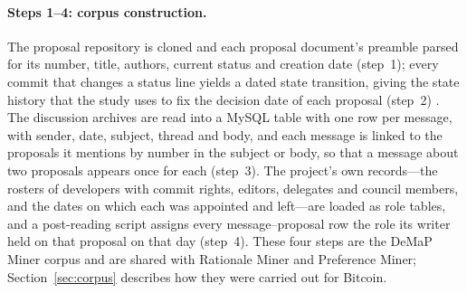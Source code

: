 \documentclass[sigconf,screen]{acmart}
\begin{document}
\paragraph{Steps 1--4: corpus construction.} The proposal repository is cloned and each proposal document's preamble parsed for its number, title, authors, current status and creation date (step~1); every commit that changes a status line yields a dated state transition, giving the state history that the study uses to fix the decision date of each proposal (step~2) \cite{sharma2022demap}. The discussion archives are read into a MySQL table with one row per message, with sender, date, subject, thread and body, and each message is linked to the proposals it mentions by number in the subject or body, so that a message about two proposals appears once for each (step~3). The project's own records---the rosters of developers with commit rights, editors, delegates and council members, and the dates on which each was appointed and left---are loaded as role tables, and a post-reading script assigns every message--proposal row the role its writer held on that proposal on that day (step~4). These four steps are the DeMaP Miner corpus and are shared with Rationale Miner and Preference Miner; Section~\ref{sec:corpus} describes how they were carried out for Bitcoin.
\end{document}
